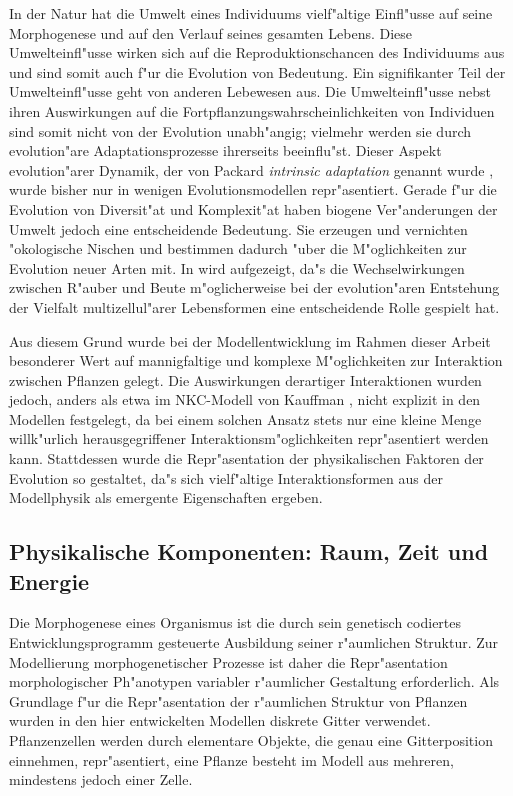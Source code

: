 In der Natur hat die Umwelt eines Individuums vielf"altige
Einfl"usse auf seine Morphogenese und auf den Verlauf seines gesamten Lebens.
Diese Umwelteinfl"usse wirken sich auf die Reproduktionschancen des
Individuums aus und sind somit auch f"ur die Evolution von Bedeutung.
Ein signifikanter Teil der Umwelteinfl"usse geht von anderen Lebewesen
aus. Die Umwelteinfl"usse nebst ihren Auswirkungen auf die Fortpflanzungswahrscheinlichkeiten
von Individuen sind somit nicht von der Evolution unabh"angig; vielmehr werden sie 
durch evolution"are Adaptationsprozesse ihrerseits beeinflu"st.
Dieser Aspekt evolution"arer Dynamik, der von Packard {\slshape intrinsic adaptation}
genannt wurde \cite{Packard89}, wurde bisher nur in wenigen Evolutionsmodellen repr"asentiert.
Gerade f"ur die Evolution von Diversit"at und Komplexit"at haben biogene Ver"anderungen
der Umwelt jedoch eine entscheidende Bedeutung. Sie erzeugen und vernichten "okologische
Nischen und bestimmen dadurch "uber die M"oglichkeiten zur Evolution neuer Arten mit.
In \cite{Stanley73} wird aufgezeigt, da"s die Wechselwirkungen zwischen R"auber und
Beute m"oglicherweise bei der evolution"aren Entstehung der Vielfalt multizellul"arer
Lebensformen eine entscheidende Rolle gespielt hat.

Aus diesem Grund wurde bei der Modellentwicklung im Rahmen dieser Arbeit besonderer
Wert auf mannigfaltige und komplexe M"oglichkeiten zur Interaktion zwischen Pflanzen
gelegt. Die Auswirkungen derartiger Interaktionen wurden jedoch, anders als etwa im
NKC-Modell von Kauffman \cite{Kauffman92}, nicht explizit in den Modellen festgelegt,
da bei einem solchen Ansatz stets nur eine kleine Menge willk"urlich herausgegriffener
Interaktionsm"oglichkeiten repr"asentiert werden kann. Stattdessen wurde die Repr"asentation
der physikalischen Faktoren der Evolution so gestaltet, da"s sich vielf"altige Interaktionsformen
aus der Modellphysik als emergente Eigenschaften ergeben.


\subsection{Physikalische Komponenten: Raum, Zeit und Energie}
\label{physicsdescr}

Die Morphogenese eines Organismus ist die durch sein genetisch codiertes
Entwicklungsprogramm gesteuerte Ausbildung seiner r"aumlichen Struktur.
Zur Modellierung morphogenetischer Prozesse ist daher die Repr"asentation
morphologischer Ph"anotypen variabler r"aumlicher Gestaltung erforderlich.
Als Grundlage f"ur die Repr"asentation der r"aumlichen Struktur von Pflanzen
wurden in den hier entwickelten Modellen diskrete Gitter verwendet.
Pflanzenzellen werden durch elementare Objekte, die genau eine Gitterposition
einnehmen, repr"asentiert, eine Pflanze besteht im Modell aus mehreren, mindestens
jedoch einer Zelle.


